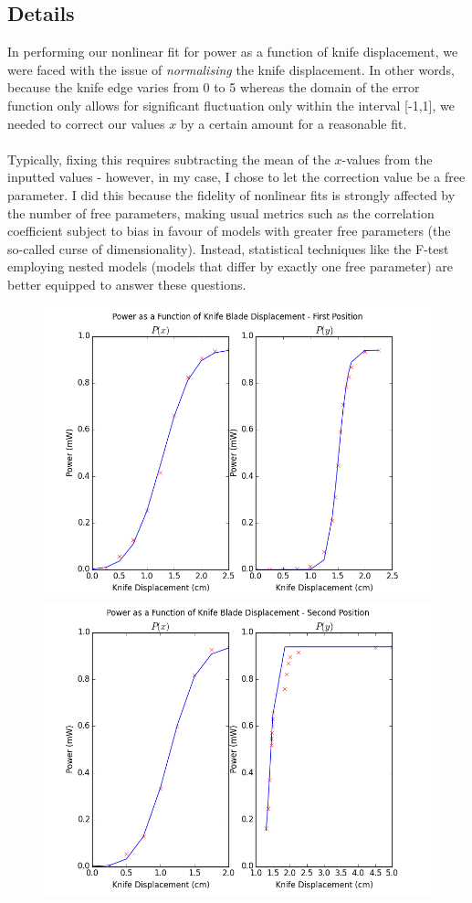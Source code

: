 \documentclass[10pt,a4paper]{article}
\begin{document}
\subsection*{Details}
In performing our nonlinear fit for power as a function of knife displacement, we were faced with the issue of \textit{normalising} the knife displacement. In other words, because the knife edge varies from 0 to 5 whereas the domain of the error function only allows for significant fluctuation only within the interval [-1,1], we needed to correct our values $x$ by a certain amount for a reasonable fit.\\
\\
Typically, fixing this requires subtracting the mean of the $x$-values from the inputted values - however, in my case, I chose to let the correction value be a free parameter. I did this because the fidelity of nonlinear fits is strongly affected by the number of free parameters, making usual metrics such as the correlation coefficient subject to bias in favour of models with greater free parameters (the so-called curse of dimensionality). Instead, statistical techniques like the F-test employing nested models (models that differ by exactly one free parameter) are better equipped to answer these questions.\begin{figure}[H]
\centering
\includegraphics[scale = 0.5]{../Analysis/figure_1.png}\\
\includegraphics[scale = 0.5]{../Analysis/figure_2.png}

\end{figure}
\end{document}
